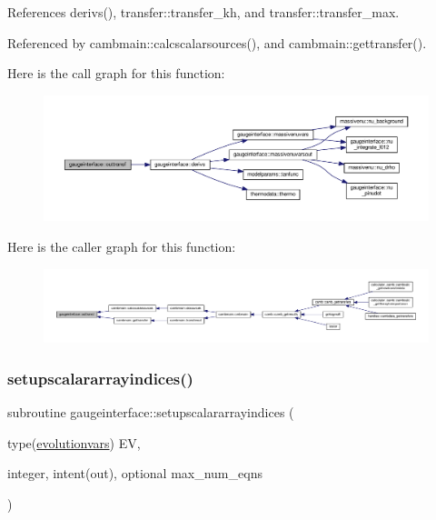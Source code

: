 References derivs(), transfer\+::transfer\+\_\+kh, and transfer\+::transfer\+\_\+max.



Referenced by cambmain\+::calcscalarsources(), and cambmain\+::gettransfer().

Here is the call graph for this function\+:
\nopagebreak
\begin{figure}[H]
\begin{center}
\leavevmode
\includegraphics[width=350pt]{namespacegaugeinterface_ae920635485c908177072c6cad0d49f59_cgraph}
\end{center}
\end{figure}
Here is the caller graph for this function\+:
\nopagebreak
\begin{figure}[H]
\begin{center}
\leavevmode
\includegraphics[width=350pt]{namespacegaugeinterface_ae920635485c908177072c6cad0d49f59_icgraph}
\end{center}
\end{figure}
\mbox{\label{namespacegaugeinterface_a50a72debb65475527ccc7e76af616083}} 
\subsubsection{\texorpdfstring{setupscalararrayindices()}{setupscalararrayindices()}}
{\footnotesize\ttfamily subroutine gaugeinterface\+::setupscalararrayindices (\begin{DoxyParamCaption}\item[{type(\mbox{\hyperlink{structgaugeinterface_1_1evolutionvars}{evolutionvars}})}]{EV,  }\item[{integer, intent(out), optional}]{max\+\_\+num\+\_\+eqns }\end{DoxyParamCaption})}



